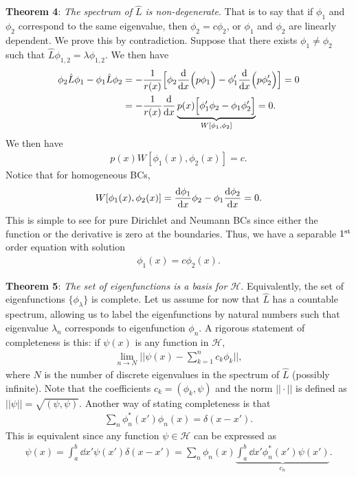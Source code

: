 \textbf{Theorem 4}: \textit{The spectrum of $\hat{L}$ is non-degenerate}.
That is to say that if $\phi_1$ and $\phi_2$ correspond to the same eigenvalue, then $\phi_2 = c \phi_2$, or $\phi_1$ and $\phi_2$ are linearly dependent.
We prove this by contradiction.
Suppose that there exists $\phi_1 \ne \phi_2$ such that $\hat{L} \phi_{1,2} = \lambda \phi_{1,2}$.
We then have
\begin{align}
    \phi_2 \hat{L} \phi_1 - \phi_1 \hat{L} \phi_2 &=  -\frac{1}{r(x)} \Big[ \phi_2 \dv{x} \Big( p \phi_1 \Big) - \phi_1' \dv{x} \Big( p \phi_2' \Big) \Big] = 0 \nonumber \\
                                                  &= -\frac{1}{r(x)} \dv{x} \underbrace{ p(x) \Big[ \phi_1' \phi_2 - \phi_1 \phi_2' \Big] }_{W[\phi_1,\phi_2]} = 0
.\end{align}
We then have 
\begin{eqnarray}
    p(x) W[\phi_1(x),\phi_2(x)] = c
.\end{eqnarray}
Notice that for homogeneous BCs,
\begin{eqnarray}
    W[\phi_1(x),\phi_2(x)] = \dv{\phi_1}{x} \phi_2 - \phi_1 \dv{\phi_2}{x} = 0
.\end{eqnarray}
This is simple to see for pure Dirichlet and Neumann BCs since either the function or the derivative is zero at the boundaries.
Thus, we have a separable $1^{\rm st}$ order equation with solution
\begin{eqnarray}
    \phi_1(x) = c\phi_2(x)
.\end{eqnarray}

\textbf{Theorem 5}: \textit{The set of eigenfunctions is a basis for $\mathcal{H}$}.
Equivalently, the set of eigenfunctions $\{ \phi_{\lambda} \} $ is complete.
Let us assume for now that $\hat{L}$ has a countable spectrum, allowing us to label the eigenfunctions by natural numbers such that eigenvalue $\lambda_{n}$ corresponds to eigenfunction $\phi_{n}$.
A rigorous statement of completeness is this: if $\psi(x)$ is any function in $\mathcal{H}$,
\begin{eqnarray}
    \lim_{n \rightarrow N} || \psi(x) - \sum_{k=1}^{n} c_{k} \phi_{k} ||
,\end{eqnarray}
where $N$ is the number of discrete eigenvalues in the spectrum of $\hat{L}$ (possibly infinite).
Note that the coefficients $c_{k} = (\phi_{k},\psi)$ and the norm $|| \cdot ||$ is defined as $|| \psi || = \sqrt{(\psi,\psi)}$.
Another way of stating completeness is that
\begin{eqnarray}
    \sum_{n} \phi_{n}^{*}(x') \phi_{n}(x) = \delta(x - x')
.\end{eqnarray}
This is equivalent since any function $\psi \in \mathcal{H}$ can be expressed as
\begin{eqnarray}
\psi(x) = \int_{a}^{b} \dd{x'} \psi(x') \delta(x - x') = \sum_{n} \phi_{n}(x) \underbrace{ \int_{a}^{b} \dd{x'} \phi_{n}^{*}(x') \psi(x') }_{c_{n}}
.\end{eqnarray}

